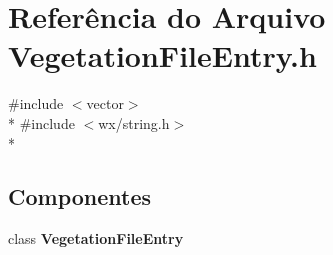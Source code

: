 \section{Referência do Arquivo Vegetation\+File\+Entry.\+h}
\label{_vegetation_file_entry_8h}
{\ttfamily \#include $<$vector$>$}\\*
{\ttfamily \#include $<$wx/string.\+h$>$}\\*
\subsection*{Componentes}
\begin{DoxyCompactItemize}
\item 
class {\bf Vegetation\+File\+Entry}
\end{DoxyCompactItemize}
